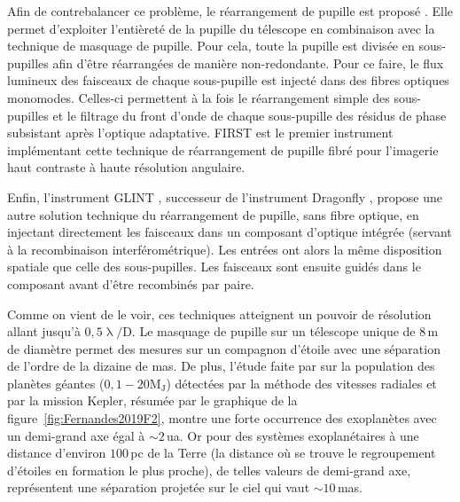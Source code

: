 Afin de contrebalancer ce problème, le réarrangement de pupille est proposé \citep{perrin2006, lacour2007}. Elle permet d'exploiter l'entièreté de la pupille du télescope en combinaison avec la technique de masquage de pupille. Pour cela, toute la pupille est divisée en sous-pupilles afin d'être réarrangées de manière non-redondante. Pour ce faire, le flux lumineux des faisceaux de chaque sous-pupille est injecté dans des fibres optiques monomodes. Celles-ci permettent à la fois le réarrangement simple des sous-pupilles et le filtrage du front d'onde de chaque sous-pupille des résidus de phase subsistant après l'optique adaptative. \ac{FIRST} est le premier instrument implémentant cette technique de réarrangement de pupille fibré \citep{kotani2008} pour l'imagerie haut contraste à haute résolution angulaire.

Enfin, l'instrument \ac{GLINT} \citep{martinod2021}, successeur de l'instrument Dragonfly \citep{jovanovic2012}, propose une autre solution technique du réarrangement de pupille, sans fibre optique, en injectant directement les faisceaux dans un composant d'optique intégrée (servant à la recombinaison interférométrique). Les entrées ont alors la même disposition spatiale que celle des sous-pupilles. Les faisceaux sont ensuite guidés dans le composant avant d'être recombinés par paire.

Comme on vient de le voir, ces techniques atteignent un pouvoir de résolution allant jusqu'à $0,5 \uplambda / \text{D}$. Le masquage de pupille sur un télescope unique de $8 \,$m de diamètre permet des mesures sur un compagnon d'étoile avec une séparation de l'ordre de la dizaine de mas. De plus, l'étude faite par \cite{fernandes2019} sur la population des planètes géantes ($0,1 - 20 \text{M}_{\text{J}}$) détectées par la méthode des vitesses radiales et par la mission Kepler, résumée par le graphique de la figure~\ref{fig:Fernandes2019F2}, montre une forte occurrence des exoplanètes avec un demi-grand axe égal à $\sim 2 \,$ua. Or pour des systèmes exoplanétaires à une distance d'environ $100 \,$pc de la Terre (la distance où se trouve le regroupement d'étoiles en formation le plus proche), de telles valeurs de demi-grand axe, représentent une séparation projetée sur le ciel qui vaut $\sim 10 \,$mas.

